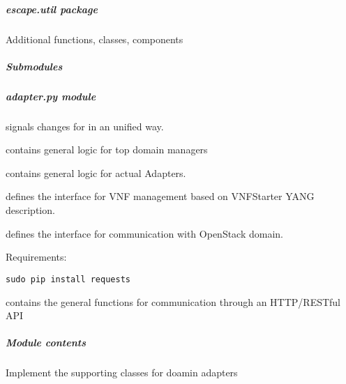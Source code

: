 \documentclass[letterpaper,10pt,english]{sphinxmanual}
\begin{document}
\subparagraph{\emph{escape.util} package}
\label{util/util:module-escape.util}\label{util/util::doc}\label{util/util:escape-util-package}
Additional functions, classes, components


\subparagraph{Submodules}
\label{util/util:submodules}

\subparagraph{\emph{adapter.py} module}
\label{util/adapter::doc}\label{util/adapter:adapter-py-module}
{\hyperref[util/adapter:escape.util.adapter.DomainChangedEvent]{\emph{}}} signals changes for {\hyperref[adapt/adaptation:escape.adapt.adaptation.ControllerAdapter]{\emph{}}} in
an unified way.

{\hyperref[util/adapter:escape.util.adapter.AbstractDomainManager]{\emph{}}} contains general logic for top domain managers

{\hyperref[util/adapter:escape.util.adapter.AbstractDomainAdapter]{\emph{}}} contains general logic for actual Adapters.

{\hyperref[util/adapter:escape.util.adapter.VNFStarterAPI]{\emph{}}} defines the interface for VNF management based on
VNFStarter YANG description.

{\hyperref[util/adapter:escape.util.adapter.OpenStackAPI]{\emph{}}} defines the interface for communication with OpenStack
domain.

Requirements:

\begin{Verbatim}[commandchars=\\\{\}]
sudo pip install requests
\end{Verbatim}

{\hyperref[util/adapter:escape.util.adapter.AbstractRESTAdapter]{\emph{}}} contains the general functions for communication
through an HTTP/RESTful API


\subparagraph{Module contents}
\label{util/adapter:module-contents}\label{util/adapter:module-escape.util.adapter}
Implement the supporting classes for doamin adapters
\end{document}
